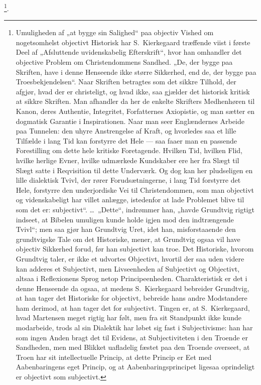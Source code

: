 \documentclass[12pt]{book}
\begin{document}
\footnote{Umuligheden af „at bygge sin Salighed“ paa objectiv
Vished om nogetsomhelst objectivt Historisk har S.\ Kierkegaard
træffende viist i første Deel af „Afsluttende uvidenskabelig
Efterskrift“, hvor han omhandler det objective Problem om
Christendommens Sandhed. „De, der bygge paa Skriften, have i denne
Henseende ikke større Sikkerhed, end de, der bygge paa
Troesbekjendelsen“.
Naar Skriften betragtes som det sikkre Tilhold,
der afgjør, hvad der er christeligt, og hvad ikke, saa gjælder det
historisk kritisk at sikkre Skriften. Man afhandler da her de
enkelte Skrifters Medhenhøren til Kanon, deres Authentie,
Integritet, Forfatternes Axiopistie, og man sætter en dogmatisk
Garantie i Inspirationen. Naar man seer Englændernes Arbeide paa
Tunnelen: den uhyre Anstrengelse af Kraft, og hvorledes saa et lille
Tilfælde i lang Tid kan forstyrre det Hele --- saa faaer man en
passende Forestilling om dette hele kritiske Foretagende. Hvilken
Tid, hvilken Flid, hvilke herlige Evner, hvilke udmærkede
Kundskaber ere her fra Slægt til Slægt satte i Reqvisition til dette
Underværk. Og dog kan her pludseligen en lille dialektisk Tvivl, der
rører Forudsætningerne, i lang Tid forstyrre det Hele, forstyrre den
underjordiske Vei til Christendommen, som man objectivt og
videnskabeligt har villet anlægge, istedenfor at lade Problemet
blive til som det er: subjectivt“. \dots\ „Dette“, indrømmer han,
„havde Grundtvig rigtigt indseet, at Bibelen umuligen kunde holde
igjen mod den indtrængende Tvivl“; men saa gjør han Grundtvig Uret,
idet han, misforstaaende den grundtvigske Tale om det Historiske,
mener, at Grundtvig ogsaa vil have objectiv Sikkerhed forud, før han
subjectivt kan troe. Det Historiske, hvorom Grundtvig taler, er ikke
et udvortes Objectivt, hvortil der saa uden videre kan adderes et
Subjectivt, men Livseenheden af Subjectivt og Objectivt, altsaa i
Reflexionens Sprog netop Principeenheden. Charakteristisk er det i
denne Henseende da ogsaa, at medens S.\ Kierkegaard bebreider
Grundtvig, at han tager det Historiske for objectivt, bebreide hans
andre Modstandere ham derimod, at han tager det for subjectivt.
Tingen er, at S.\ Kierkegaard, hvad Martensen meget rigtig har
følt, men fra sit Standpunkt ikke kunde modarbeide, trods al sin
Dialektik har løbet sig fast i Subjectivisme: han har som ingen
Anden bragt det til Evidens, at Subjectiviteten i den Troende er
Sandheden, men med Blikket uafladelig fæstet paa den Troende
overseet, at Troen har sit intellectuelle Princip, at dette Princip
er Eet med Aabenbaringens eget Princip, og at Aabenbaringsprincipet
ligesaa oprindeligt er objectivt som subjectivt.}.
\end{document}
